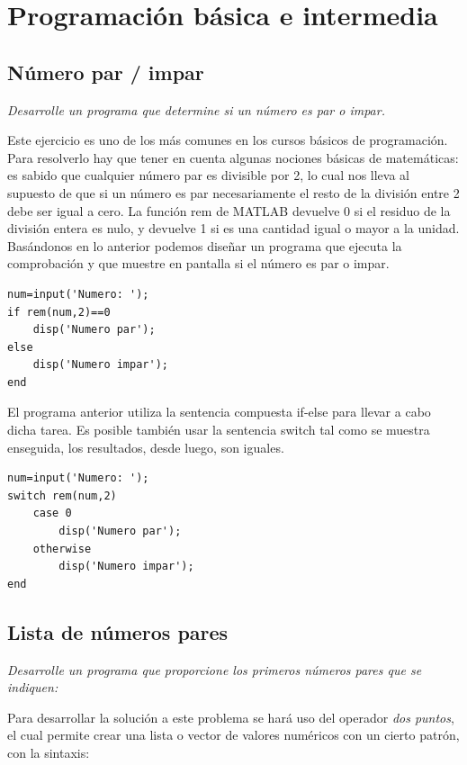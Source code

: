 \chapter{Programación básica e intermedia}

\section{Número par / impar}

\textit{Desarrolle un programa que determine si un número es par o impar.}

Este ejercicio es uno de los más comunes en los cursos básicos de programación. 
Para resolverlo hay que tener en cuenta algunas nociones básicas de matemáticas: es 
sabido que cualquier número par es divisible por 2, lo cual nos lleva al supuesto de que 
si un número es par necesariamente el resto de la división entre 2 debe ser igual a cero. 
La función rem de MATLAB devuelve 0 si el residuo de la división entera es nulo, y devuelve 1 
si es una cantidad igual o mayor a la unidad. Basándonos en lo anterior podemos diseñar 
un programa que ejecuta la comprobación y que muestre en pantalla si el número es par o impar.

\begin{verbatim}
num=input('Numero: ');
if rem(num,2)==0
    disp('Numero par');
else
    disp('Numero impar');
end
\end{verbatim}

El programa anterior utiliza la sentencia compuesta if-else para llevar a cabo dicha tarea. 
Es posible también usar la sentencia switch tal como se muestra enseguida, los resultados, desde luego, son iguales.

\begin{verbatim}
num=input('Numero: ');
switch rem(num,2)
    case 0
        disp('Numero par');
    otherwise
        disp('Numero impar');
end
\end{verbatim}


\section{Lista de números pares}

\textit{Desarrolle un programa que proporcione los primeros números pares que se indiquen:}



Para desarrollar la solución a este problema se hará uso del operador {\it dos puntos}, el cual 
permite crear una lista o vector de valores numéricos con un cierto patrón, con la sintaxis:

